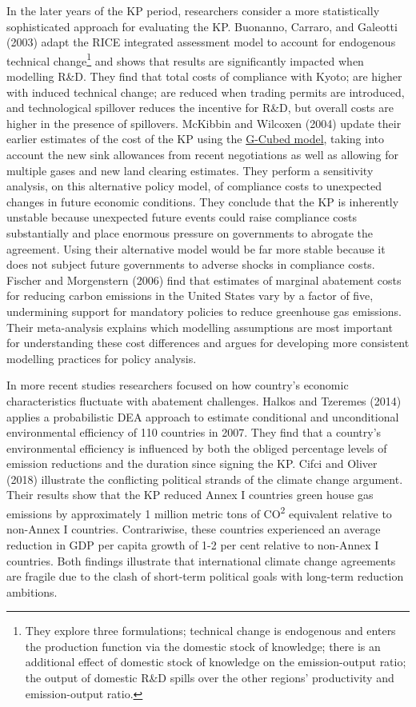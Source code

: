 \documentclass[
  10pt,
]{article}
\begin{document}
In the later years of the KP period, researchers consider a more
statistically sophisticated approach for evaluating the KP. Buonanno,
Carraro, and Galeotti (2003) adapt the RICE integrated assessment model
to account for endogenous technical change\footnote{They explore three
formulations; technical change is endogenous and enters the production
function via the domestic stock of knowledge; there is an additional
effect of domestic stock of knowledge on the emission-output ratio; the
output of domestic R\&D spills over the other regions' productivity and
emission-output ratio.} and shows that results are significantly
impacted when modelling R\&D. They find that total costs of compliance
with Kyoto; are higher with induced technical change; are reduced when
trading permits are introduced, and technological spillover reduces the
incentive for R\&D, but overall costs are higher in the presence of
spillovers. McKibbin and Wilcoxen (2004) update their earlier estimates
of the cost of the KP using the
\href{https://unfccc.int/topics/mitigation/workstreams/response-measures/modelling-tools-to-assess-the-impact-of-the-implementation-of-response-measures/response-measures-models-g-cubed}{G-Cubed
model}, taking into account the new sink allowances from recent
negotiations as well as allowing for multiple gases and new land
clearing estimates. They perform a sensitivity analysis, on this alternative policy model, of compliance
costs to unexpected changes in future economic conditions. They conclude that the KP is
inherently unstable because unexpected future events could raise
compliance costs substantially and place enormous pressure on
governments to abrogate the agreement.  Using their alternative model would be
far more stable because it does not subject future governments to
adverse shocks in compliance costs. Fischer and Morgenstern (2006) find
that estimates of marginal abatement costs for reducing carbon emissions
in the United States  vary by a
factor of five, undermining support for mandatory policies to reduce
greenhouse gas emissions. Their meta-analysis explains which modelling
assumptions are most important for understanding these cost differences
and argues for developing more consistent modelling practices for policy
analysis.

In more recent studies researchers focused on how
country's economic characteristics fluctuate with abatement challenges.
Halkos and Tzeremes (2014) applies a probabilistic DEA approach to
estimate conditional and unconditional environmental efficiency of 110
countries in 2007. They find that a country's environmental efficiency
is influenced by both the obliged percentage
levels of emission reductions and  the duration since signing
the KP. Cifci and Oliver (2018) illustrate
the conflicting political strands of the climate change argument. Their
results show that the KP reduced Annex I countries green house gas emissions by
approximately 1 million metric tons of CO\textsuperscript{2} equivalent
relative to non-Annex I countries. Contrariwise, these countries
experienced an average reduction in GDP per capita growth of 1-2 per
cent relative to non-Annex I countries. Both findings illustrate that
international climate change agreements are fragile due to the clash of short-term political goals with long-term reduction ambitions.
\end{document}
